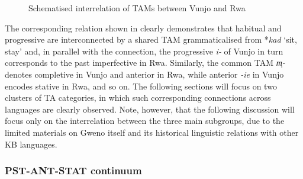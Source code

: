 \documentclass[output=paper]{langscibook}
\begin{document}
\begin{figure}

\caption{Schematised interrelation of TAMs between Vunjo and Rwa}
\label{fig:shinagawa:1}
\end{figure}

The corresponding relation shown in  clearly demonstrates that habitual and progressive are interconnected by a shared TAM grammaticalised from *\textit{kad} ‘sit, stay’ and, in parallel with the connection, the progressive \textit{i-} of Vunjo in turn corresponds to the past imperfective in Rwa. Similarly, the common TAM \textit{m̩-} denotes completive in Vunjo and anterior in Rwa, while anterior \textit{{}-ie} in Vunjo encodes stative in Rwa, and so on. The following sections will focus on two clusters of TA categories, in which such corresponding connections across languages are clearly observed. Note, however, that the following discussion will focus only on the interrelation between the three main subgroups, due to the limited materials on Gweno itself and its historical linguistic relations with other KB languages.

\subsubsection{PST-ANT-STAT continuum}\label{sec:shinagawa:4.1.1}
\end{document}
